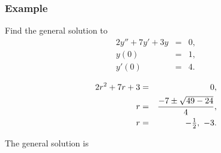 \begin{frame}
  \frametitle{Example}

  Find the general solution to
  \begin{eqnarray*}
    2y'' + 7y' + 3y & = & 0, \\
    y(0) & = & 1, \\
    y'(0) & = & 4.
  \end{eqnarray*}

  {
    \begin{eqnarray*}
      2r^2 + 7r + 3 & = & 0, \\
      r & = & \frac{-7\pm\sqrt{49-24}}{4}, \\
      r & = & -\mbox{$\frac{1}{2}$},~-3.
    \end{eqnarray*}

    The general solution is

  }


\end{frame}


